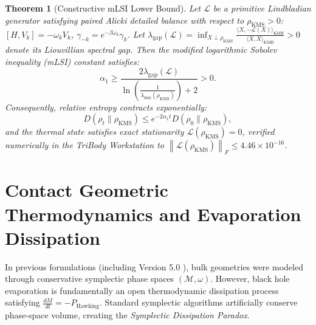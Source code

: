\documentclass[11pt,a4paper,reqno]{article}
\newtheorem{theorem}{Theorem}[section]
\theoremstyle{definition}
\newcommand{\KMS}{\mathrm{KMS}}
\newcommand{\norm}[1]{\left\lVert #1 \right\rVert}
\numberwithin{equation}{section}
\begin{document}
\begin{theorem}[Constructive mLSI Lower Bound]
Let $\mathcal{L}$ be a primitive Lindbladian generator satisfying paired Alicki detailed balance \cite{Alicki1976} with respect to $\rho_{\KMS} > 0$: $[H, V_k] = -\omega_k V_k$, $\gamma_{-k} = e^{-\beta \omega_k} \gamma_k$. Let $\lambda_{\mathrm{gap}}(\mathcal{L}) = \inf_{X \perp \rho_{\KMS}} \frac{\langle X, -\mathcal{L}(X)\rangle_{\mathrm{KMB}}}{\langle X, X\rangle_{\mathrm{KMB}}} > 0$ denote its Liouvillian spectral gap. Then the modified logarithmic Sobolev inequality (mLSI) constant satisfies:
\begin{equation}
\alpha_1 \ge \frac{2 \lambda_{\mathrm{gap}}(\mathcal{L})}{\ln\left( \frac{1}{\lambda_{\min}(\rho_{\KMS})} \right) + 2} > 0.
\end{equation}
Consequently, relative entropy contracts exponentially:
\begin{equation}
D(\rho_t \parallel \rho_{\KMS}) \le e^{-2\alpha_1 t} D(\rho_0 \parallel \rho_{\KMS}),
\end{equation}
and the thermal state satisfies exact stationarity $\mathcal{L}(\rho_{\KMS}) = 0$, verified numerically in the \textit{TriBody Workstation} to $\norm{\mathcal{L}(\rho_{\KMS})}_F \le 4.46 \times 10^{-16}$.
\end{theorem}

\section{Contact Geometric Thermodynamics and Evaporation Dissipation}
In previous formulations (including Version 5.0 \cite{Ananda2026V5}), bulk geometries were modeled through conservative symplectic phase spaces $(\mathcal{M}, \omega)$. However, black hole evaporation is fundamentally an open thermodynamic dissipation process satisfying $\frac{dM}{dt} = -P_{\mathrm{Hawking}}$. Standard symplectic algorithms artificially conserve phase-space volume, creating the \textit{Symplectic Dissipation Paradox}.
\end{document}

